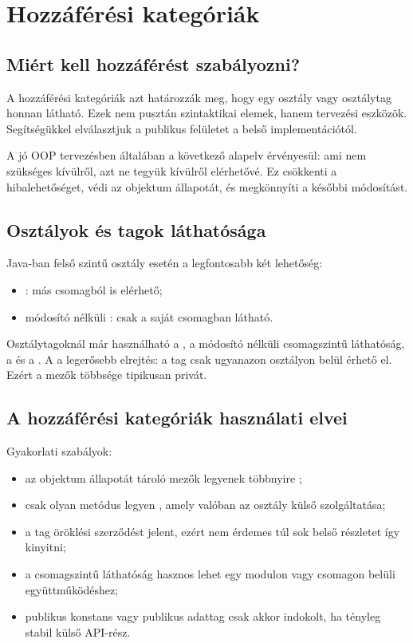 \section{Hozzáférési kategóriák}

\subsection{Miért kell hozzáférést szabályozni?}

A hozzáférési kategóriák azt határozzák meg, hogy egy osztály vagy osztálytag honnan látható. Ezek nem pusztán szintaktikai elemek, hanem tervezési eszközök. Segítségükkel elválasztjuk a publikus felületet a belső implementációtól.

A jó OOP tervezésben általában a következő alapelv érvényesül: ami nem szükséges kívülről, azt ne tegyük kívülről elérhetővé. Ez csökkenti a hibalehetőséget, védi az objektum állapotát, és megkönnyíti a későbbi módosítást.

\begin{center}

\end{center}

\subsection{Osztályok és tagok láthatósága}

Java-ban felső szintű osztály esetén a legfontosabb két lehetőség:

\begin{itemize}
  \item {}: más csomagból is elérhető;
  \item módosító nélküli : csak a saját csomagban látható.
\end{itemize}

Osztálytagoknál már használható a , a módosító nélküli csomagszintű láthatóság, a  és a . A  a legerősebb elrejtés: a tag csak ugyanazon osztályon belül érhető el. Ezért a mezők többsége tipikusan privát.

\subsection{A hozzáférési kategóriák használati elvei}

Gyakorlati szabályok:

\begin{itemize}
  \item az objektum állapotát tároló mezők legyenek többnyire ;
  \item csak olyan metódus legyen , amely valóban az osztály külső szolgáltatása;
  \item a  tag öröklési szerződést jelent, ezért nem érdemes túl sok belső részletet így kinyitni;
  \item a csomagszintű láthatóság hasznos lehet egy modulon vagy csomagon belüli együttműködéshez;
  \item publikus konstans vagy publikus adattag csak akkor indokolt, ha tényleg stabil külső API-rész.
\end{itemize}


